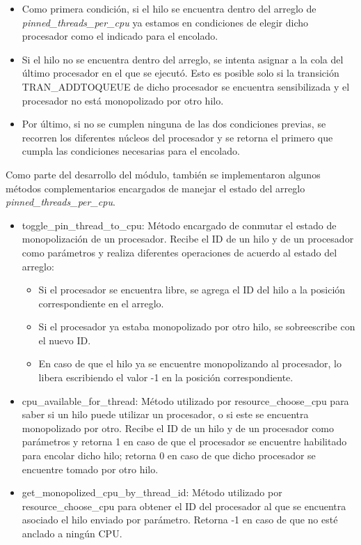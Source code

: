 \begin{itemize}
    \item Como primera condición, si el hilo se encuentra dentro del arreglo de \textit{pinned\_threads\_per\_cpu} ya estamos en condiciones de elegir dicho procesador como el indicado para el encolado.
    \item Si el hilo no se encuentra dentro del arreglo, se intenta asignar a la cola del último procesador en el que se ejecutó. Esto es posible solo si la transición TRAN\_ADDTOQUEUE de dicho procesador se encuentra sensibilizada y el procesador no está monopolizado por otro hilo.
    \item Por último, si no se cumplen ninguna de las dos condiciones previas, se recorren los diferentes núcleos del procesador y se retorna el primero que cumpla las condiciones necesarias para el encolado.
\end{itemize}

Como parte del desarrollo del módulo, también se implementaron algunos métodos complementarios encargados de manejar el estado del arreglo  \textit{pinned\_threads\_per\_cpu}.

\begin{itemize}
    \item toggle\_pin\_thread\_to\_cpu: Método encargado de conmutar el estado de monopolización de un procesador. Recibe el ID de un hilo y de un procesador como parámetros y realiza diferentes operaciones de acuerdo al estado del arreglo:
    \begin{itemize}
        \item Si el procesador se encuentra libre, se agrega el ID del hilo a la posición correspondiente en el arreglo.
        \item Si el procesador ya estaba monopolizado por otro hilo, se sobreescribe con el nuevo ID.
        \item En caso de que el hilo ya se encuentre monopolizando al procesador, lo libera escribiendo el valor -1 en la posición correspondiente.
    \end{itemize}
    \item cpu\_available\_for\_thread: Método utilizado por resource\_choose\_cpu para saber si un hilo puede utilizar un procesador, o si este se encuentra monopolizado por otro. Recibe el ID de un hilo y de un procesador como parámetros y retorna 1 en caso de que el procesador se encuentre habilitado para encolar dicho hilo; retorna 0 en caso de que dicho procesador se encuentre tomado por otro hilo.
    \item get\_monopolized\_cpu\_by\_thread\_id: Método utilizado por resource\_choose\_cpu para obtener el ID del procesador al que se encuentra asociado el hilo enviado por parámetro. Retorna -1 en caso de que no esté anclado a ningún CPU.
\end{itemize}

